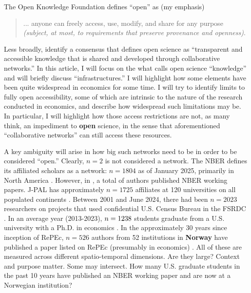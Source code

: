 \documentclass{article}
\begin{document}
The Open Knowledge Foundation \parencite[OKF]{open_knowledge_foundation_defining_2024} defines ``open'' as (my emphasis)

\begin{quote}

    ... anyone can freely access, use, modify, and share for any purpose \textit{(subject, at most, to requirements that preserve provenance and openness)}.
    
\end{quote}

Less broadly, \citet{vicente-saez_open_2018} identify a consensus that defines open science as ``transparent and accessible knowledge that is shared and developed through collaborative networks.''
%
In this article, I will focus on the what \cite{unesco_understanding_2022} calls open science ``knowledge'' and will briefly discuss ``infrastructures.'' I will highlight how some elements have been quite widespread in economics for some time. I will try to identify limits to fully open accessibility, some of which are intrinsic to the nature of the research conducted in economics, and describe how widespread such limitations may be. In particular, I will highlight how those access restrictions are not, as many think, an impediment to \textbf{open} science, in the sense that aforementioned ``collaborative networks'' can still access these resources. 


A key ambiguity will arise in how big such networks need to be in order to be considered ``open.'' Clearly, $n=2$ is not considered a network. The \ac{NBER} defines its affiliated scholars as a network: $n=1804$ as of January 2025, primarily in North America \citep{national_bureau_of_economic_research_affiliated_2025}. However, in \nberyear{}, a total of \nberauthorsunique{} authors published \nberpapers{} NBER working papers. J-PAL has approximately $n=1725$ affiliates at 120 universities on all populated continents \citep{abdul_latif_jameel_poverty_action_lab_affiliated_2025}. Between 2001 and June 2024, there had been $n=2023$ researchers on projects that used confidential U.S. Census Bureau in the \ac{FSRDC} \citep{us_census_bureau_uscensusbureaufsrdc-external-census-projects_2024}. In an average year (2013-2023), $n=1238{}$ students graduate from a U.S. university with a Ph.D. in economics \citep[Table 1-5]{national_science_foundation_doctorate_2024}. In the approximately 30 years since inception of \ac{RePEc}, $n=526$ authors from 52 institutions in \textbf{Norway} have published a paper listed on \ac{RePEc} (presumably in economics) \citep{ideasrepec_within_2025}. All of these are measured across different spatio-temporal dimensions. Are they large? Context and purpose matter. Some may intersect. How many U.S. graduate students in the past 10 years have published an NBER working paper and are now at a Norwegian institution? 
\end{document}
